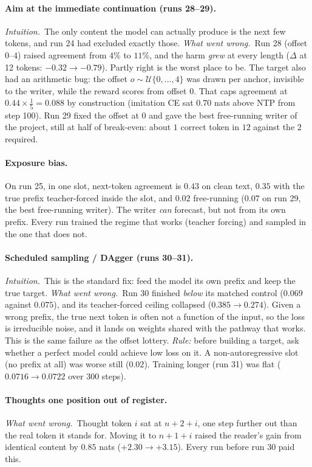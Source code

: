\documentclass[11pt]{article}
\newcommand{\why}{\emph{Intuition.}\ }
\newcommand{\fail}{\emph{What went wrong.}\ }
\begin{document}
\paragraph{Aim at the immediate continuation (runs 28--29).}
\why The only content the model can actually produce is the next few tokens, and run 24 had excluded exactly those.
\fail Run 28 (offset $0$--$4$) raised agreement from $4\%$ to $11\%$, and the harm \emph{grew} at every length ($\Delta$ at 12 tokens: $-0.32\to-0.79$). Partly right is the worst place to be. The target also had an arithmetic bug: the offset $o\sim\mathcal{U}\{0,\dots,4\}$ was drawn per anchor, invisible to the writer, while the reward scores from offset $0$. That caps agreement at $0.44\times\tfrac15=0.088$ by construction (imitation CE sat $0.70$ nats above NTP from step 100). Run 29 fixed the offset at $0$ and gave the best free-running writer of the project, still at half of break-even: about $1$ correct token in $12$ against the $2$ required.

\paragraph{Exposure bias.}
On run 25, in one slot, next-token agreement is $0.43$ on clean text, $0.35$ with the true prefix teacher-forced inside the slot, and $0.02$ free-running ($0.07$ on run 29, the best free-running writer). The writer \emph{can} forecast, but not from its own prefix. Every run trained the regime that works (teacher forcing) and sampled in the one that does not.

\paragraph{Scheduled sampling / DAgger (runs 30--31).}
\why This is the standard fix: feed the model its own prefix and keep the true target.
\fail Run 30 finished \emph{below} its matched control ($0.069$ against $0.075$), and its teacher-forced ceiling collapsed ($0.385\to0.274$). Given a wrong prefix, the true next token is often not a function of the input, so the loss is irreducible noise, and it lands on weights shared with the pathway that works. This is the same failure as the offset lottery. \emph{Rule:} before building a target, ask whether a perfect model could achieve low loss on it. A non-autoregressive slot (no prefix at all) was worse still ($0.02$). Training longer (run 31) was flat ($0.0716\to0.0722$ over 300 steps).

\paragraph{Thoughts one position out of register.}
\fail Thought token $i$ sat at $n+2+i$, one step further out than the real token it stands for. Moving it to $n+1+i$ raised the reader's gain from identical content by $0.85$ nats ($+2.30\to+3.15$). Every run before run 30 paid this.
\end{document}
